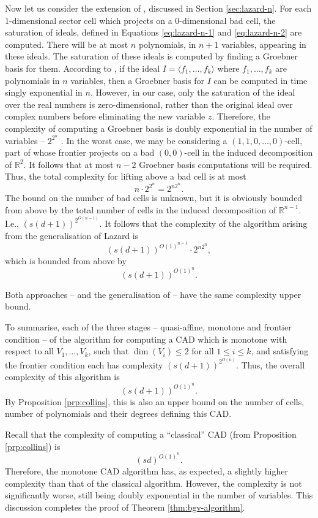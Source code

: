 \documentclass[
]{book}
\theoremstyle{definition}
\theoremstyle{definition}
\theoremstyle{definition}
\theoremstyle{definition}
\theoremstyle{remark}
\begin{document}
Now let us consider the extension of \citet{lazard10}, discussed in Section \ref{sec:lazard-n}.
For each \(1\)-dimensional sector cell which projects on a \(0\)-dimensional bad cell, the saturation of ideals, defined in Equations \eqref{eq:lazard-n-1} and \eqref{eq:lazard-n-2} are computed. There will be at most \(n\) polynomials, in \(n+1\) variables, appearing in these ideals. The saturation of these ideals is computed by finding a Groebner basis for them.
According to \citet{lakshman1991}, if the ideal \(I = \langle f_1,\ldots,f_k\rangle\) where \(f_1,\ldots,f_k\) are polynomials in \(n\) variables, then a Groebner basis for \(I\) can be computed in time singly exponential in \(n\).
However, in our case, only the saturation of the ideal over the real numbers is zero-dimensional, rather than the
original ideal over complex numbers before eliminating the new variable \(z\). Therefore, the complexity of computing a
Groebner basis is doubly exponential in the number of variables -- \(2^{2^n}\) \citep{mayr1997}. In the worst case, we may be considering a \((1,1,0,\ldots,0)\)-cell, part of whose frontier projects on a bad \((0,0)\)-cell in the induced decomposition of \(\mathbb{R}^2\). It follows that at most \(n-2\) Groebner basis computations will be required. Thus, the total complexity for lifting above a bad cell is at most
\[
n \cdot 2^{2^n} = 2^{n 2^n}.
\]
The bound on the number of bad cells is unknown, but it is obviously bounded from above by the total number of cells in the induced decomposition of \(\mathbb{R}^{n-1}\). I.e., \((s(d+1))^{2^{O(n-1)}}\).
It follows that the complexity of the algorithm arising from the generalisation of Lazard is
\[
(s(d+1))^{O(1)^{n-1}} \cdot 2^{n 2^n},
\]
which is bounded from above by
\[
(s(d+1))^{O(1)^{n}}.
\]

Both approaches -- \citet{bgv15} and the generalisation of \citet{lazard10} -- have the same complexity upper bound.

To summarise, each of the three stages -- quasi-affine, monotone and frontier condition -- of the algorithm for computing a CAD which is monotone with respect to all \(V_1,\ldots,V_k\), such that \(\dim(V_i) \le 2\) for all \(1 \le i \le k\), and satisfying the frontier condition each has complexity \((s(d+1))^{2^{O(n)}}\).
Thus, the overall complexity of this algorithm is
\[
(s(d+1))^{O(1)^{n}}.
\]
By Proposition \ref{prp:collins}, this is also an upper bound on the number of cells, number of polynomials and their degrees defining this CAD.

Recall that the complexity of computing a ``classical'' CAD (from Proposition \ref{prp:collins}) is \[
(sd)^{O(1)^n}.
\]
Therefore, the monotone CAD algorithm has, as expected, a slightly higher complexity than that of the classical algorithm.
However, the complexity is not significantly worse, still being doubly exponential in the number of variables.
This discussion completes the proof of Theorem \ref{thm:bgv-algorithm}.
\end{document}
